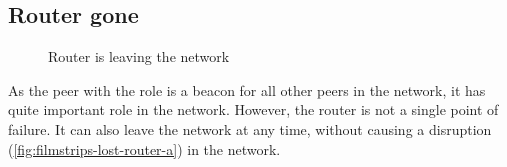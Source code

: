 \subsection{Router gone}

\begin{figure}[htb!]
  \centering
	\caption{Router is leaving the network}
\label{fig:filmstrips-lost-router}
\end{figure}

As the peer with the role \router is a beacon for all other peers in the network, it has quite important role in the network. However, the router is not a single point of failure. It can also leave the network at any time, without causing a disruption (\vref{fig:filmstrips-lost-router-a}) in the network.


